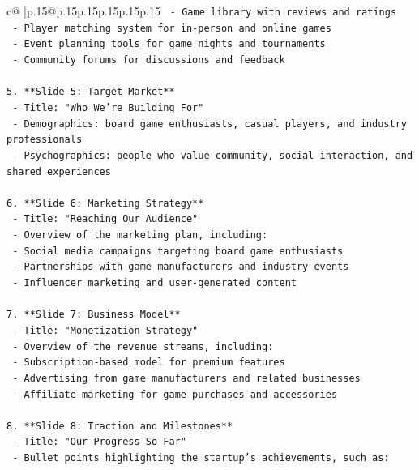 \documentclass{article}
\begin{document}
{\begin{supertabular}{c@{$\;$}|p{.15\linewidth}@{}p{.15\linewidth}p{.15\linewidth}p{.15\linewidth}p{.15\linewidth}p{.15\linewidth}}
{{{\texttt{     {-} Game library with reviews and ratings} \\
\texttt{     {-} Player matching system for in{-}person and online games} \\
\texttt{     {-} Event planning tools for game nights and tournaments} \\
\texttt{     {-} Community forums for discussions and feedback} \\
\\ 
\texttt{5. **Slide 5: Target Market**} \\
\texttt{   {-} Title: "Who We're Building For"} \\
\texttt{   {-} Demographics: board game enthusiasts, casual players, and industry professionals} \\
\texttt{   {-} Psychographics: people who value community, social interaction, and shared experiences} \\
\\ 
\texttt{6. **Slide 6: Marketing Strategy**} \\
\texttt{   {-} Title: "Reaching Our Audience"} \\
\texttt{   {-} Overview of the marketing plan, including:} \\
\texttt{     {-} Social media campaigns targeting board game enthusiasts} \\
\texttt{     {-} Partnerships with game manufacturers and industry events} \\
\texttt{     {-} Influencer marketing and user{-}generated content} \\
\\ 
\texttt{7. **Slide 7: Business Model**} \\
\texttt{   {-} Title: "Monetization Strategy"} \\
\texttt{   {-} Overview of the revenue streams, including:} \\
\texttt{     {-} Subscription{-}based model for premium features} \\
\texttt{     {-} Advertising from game manufacturers and related businesses} \\
\texttt{     {-} Affiliate marketing for game purchases and accessories} \\
\\ 
\texttt{8. **Slide 8: Traction and Milestones**} \\
\texttt{   {-} Title: "Our Progress So Far"} \\
\texttt{   {-} Bullet points highlighting the startup's achievements, such as:} \\
}}}
\end{supertabular}}
\end{document}

